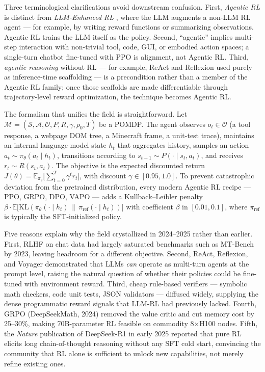 \documentclass{article}
\begin{document}
Three terminological clarifications avoid downstream confusion. First, \emph{Agentic RL} is distinct from \emph{LLM-Enhanced RL} \citep{cao20242024}, where the LLM augments a non-LLM RL agent --- for example, by writing reward functions or summarizing observations. Agentic RL trains the LLM itself as the policy. Second, ``agentic'' implies multi-step interaction with non-trivial tool, code, GUI, or embodied action spaces; a single-turn chatbot fine-tuned with PPO is alignment, not Agentic RL. Third, \emph{agentic reasoning} without RL --- for example, ReAct \citep{yao20232023} and Reflexion \citep{shinn20232023} used purely as inference-time scaffolding --- is a precondition rather than a member of the Agentic RL family; once those scaffolds are made differentiable through trajectory-level reward optimization, the technique becomes Agentic RL.

The formalism that unifies the field is straightforward. Let \(\mathcal{M} = (\mathcal{S}, \mathcal{A}, \mathcal{O}, P, R, \gamma, \rho_0, T)\) be a POMDP. The agent observes \(o_t \in \mathcal{O}\) (a tool response, a webpage DOM tree, a Minecraft frame, a unit-test trace), maintains an internal language-model state \(h_t\) that aggregates history, samples an action \(a_t \sim \pi_\theta(a_t \mid h_t)\), transitions according to \(s_{t+1} \sim P(\cdot \mid s_t, a_t)\), and receives \(r_t \sim R(s_t, a_t)\). The objective is the expected discounted return \(J(\theta) = \mathbb{E}_{\pi_\theta}\bigl[\sum_{t=0}^{T} \gamma^t r_t\bigr]\), with discount \(\gamma \in [0.95, 1.0]\). To prevent catastrophic deviation from the pretrained distribution, every modern Agentic RL recipe --- PPO, GRPO, DPO, VAPO --- adds a Kullback--Leibler penalty \(\beta \cdot \mathbb{E}\bigl[\mathrm{KL}(\pi_\theta(\cdot\mid h_t) \,\|\, \pi_{\mathrm{ref}}(\cdot\mid h_t))\bigr]\) with coefficient \(\beta\) in \([0.01, 0.1]\), where \(\pi_{\mathrm{ref}}\) is typically the SFT-initialized policy.

Five reasons explain why the field crystallized in 2024--2025 rather than earlier. First, RLHF on chat data had largely saturated benchmarks such as MT-Bench by 2023, leaving headroom for a different objective. Second, ReAct, Reflexion, and Voyager \citep{wang20232023} demonstrated that LLMs \emph{can} operate as multi-turn agents at the prompt level, raising the natural question of whether their policies could be fine-tuned with environment reward. Third, cheap rule-based verifiers --- symbolic math checkers, code unit tests, JSON validators --- diffused widely, supplying the dense programmatic reward signals that LLM-RL had previously lacked. Fourth, GRPO (DeepSeekMath, 2024) removed the value critic and cut memory cost by 25--30\%, making 70B-parameter RL feasible on commodity 8×H100 nodes. Fifth, the \emph{Nature} publication of DeepSeek-R1 in early 2025 reported that pure RL elicits long chain-of-thought reasoning without any SFT cold start, convincing the community that RL alone is sufficient to unlock new capabilities, not merely refine existing ones.
\end{document}
